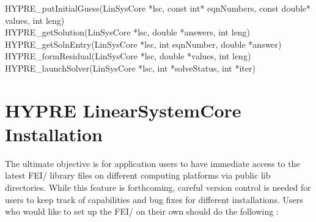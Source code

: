 \begin{tabbing}
{\sf HYPRE\_putInitialGuess(LinSysCore *lsc, const int* eqnNumbers,
                          const double* values, int leng)} \\[1mm]
{\sf HYPRE\_getSolution(LinSysCore *lsc, double *answers, int leng)} \\[1mm]

{\sf HYPRE\_getSolnEntry(LinSysCore *lsc, int eqnNumber, double *answer)} \\[1mm]

{\sf HYPRE\_formResidual(LinSysCore *lsc, double *values, int leng)} \\[1mm]

{\sf HYPRE\_launchSolver(LinSysCore *lsc, int *solveStatus, int *iter)} \\[1mm]
\end{tabbing}

\section{HYPRE LinearSystemCore Installation}

The ultimate objective is for application users to have immediate access
to the latest FEI/\hypre{} library files on different computing platforms
via public {\sf lib} directories.  While this feature is forthcoming, careful 
version control is needed for users to keep track of capabilities and bug fixes 
for different installations.  Users who would like to set up the FEI/\hypre{}
on their own should do the following :

